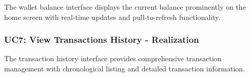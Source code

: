 The wallet balance interface displays the current balance prominently on the home screen with real-time updates and pull-to-refresh functionality.


\subsubsection{UC7: View Transactions History - Realization}

The transaction history interface provides comprehensive transaction management with chronological listing and detailed transaction information.

